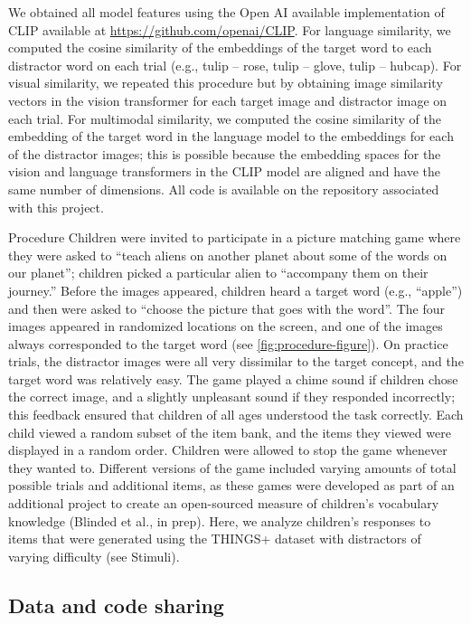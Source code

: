 \documentclass[
  man,mask]{apa6}
\begin{document}
We obtained all model features using the Open AI available implementation of CLIP available at \url{https://github.com/openai/CLIP}. For language similarity, we computed the cosine similarity of the embeddings of the target word to each distractor word on each trial (e.g., tulip -- rose, tulip -- glove, tulip -- hubcap). For visual similarity, we repeated this procedure but by obtaining image similarity vectors in the vision transformer for each target image and distractor image on each trial. For multimodal similarity, we computed the cosine similarity of the embedding of the target word in the language model to the embeddings for each of the distractor images; this is possible because the embedding spaces for the vision and language transformers in the CLIP model are aligned and have the same number of dimensions. All code is available on the repository associated with this project.

Procedure
Children were invited to participate in a picture matching game where they were asked to ``teach aliens on another planet about some of the words on our planet''; children picked a particular alien to ``accompany them on their journey.'' Before the images appeared, children heard a target word (e.g., ``apple'') and then were asked to ``choose the picture that goes with the word''. The four images appeared in randomized locations on the screen, and one of the images always corresponded to the target word (see \ref{fig:procedure-figure}). On practice trials, the distractor images were all very dissimilar to the target concept, and the target word was relatively easy. The game played a chime sound if children chose the correct image, and a slightly unpleasant sound if they responded incorrectly; this feedback ensured that children of all ages understood the task correctly. Each child viewed a random subset of the item bank, and the items they viewed were displayed in a random order. Children were allowed to stop the game whenever they wanted to. Different versions of the game included varying amounts of total possible trials and additional items, as these games were developed as part of an additional project to create an open-sourced measure of children's vocabulary knowledge (Blinded et al., in prep). Here, we analyze children's responses to items that were generated using the THINGS+ dataset with distractors of varying difficulty (see Stimuli).

\subsection{Data and code sharing}\label{data-and-code-sharing}
\end{document}
